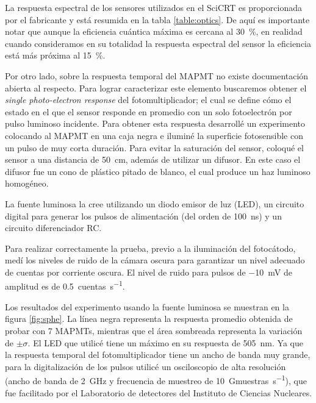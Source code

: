 La respuesta espectral de los sensores utilizados en el SciCRT es proporcionada por el fabricante y está resumida en la tabla \ref{table:optics}. De aquí es importante notar que aunque la eficiencia cuántica máxima es cercana al \SI{30}{\percent}, en realidad cuando consideramos en su totalidad la respuesta espectral del sensor la eficiencia está más próxima al \SI{15}{\percent}.

Por otro lado, sobre la respuesta temporal del MAPMT no existe documentación abierta al respecto. Para lograr caracterizar este elemento buscaremos obtener el \emph{single photo-electron response} del fotomultiplicador; el cual se define cómo el estado en el que el sensor responde en promedio con un solo fotoelectrón por pulso luminoso incidente. Para obtener esta respuesta desarrollé un experimento colocando al MAPMT en una caja negra e iluminé la superficie fotosensible con un pulso de muy corta duración. Para evitar la saturación del sensor, coloqué el sensor a una distancia de \SI{50}{\cm}, además de utilizar un difusor. En este caso el difusor fue un cono de plástico pitado de blanco, el cual produce un haz luminoso homogéneo.

La fuente luminosa la cree utilizando un diodo emisor de luz (LED), un circuito digital para generar los pulsos de alimentación (del orden de \SI{100}{\nano\second}) y un circuito diferenciador RC.

Para realizar correctamente la prueba, previo a la iluminación del fotocátodo, medí los niveles de ruido de la cámara oscura para garantizar un nivel adecuado de cuentas por corriente oscura. El nivel de ruido para pulsos de \SI{-10}{\milli\volt} de amplitud es de \SI{0.5}{cuentas\per\second}.

Los resultados del experimento usando la fuente luminosa se muestran en la figura \ref{fig:sphe}. La línea negra representa la respuesta promedio obtenida de probar con \num{7} MAPMTs, mientras que el área sombreada representa la variación de $\pm\sigma$. El LED que utilicé tiene un máximo en su respuesta de \SI{505}{\nano\metre}. Ya que la respuesta temporal del fotomultiplicador tiene un ancho de banda muy grande, para la digitalización de los pulsos utilicé un osciloscopio de alta resolución  (ancho de banda de \SI{2}{\giga\hertz} y frecuencia de muestreo de \SI{10}{\giga muestras\per\second}), que fue facilitado por el Laboratorio de detectores del Instituto de Ciencias Nucleares.

